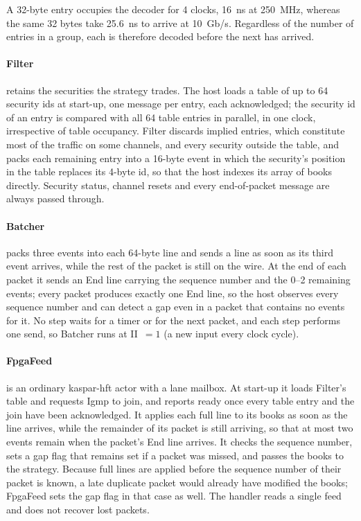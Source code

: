\documentclass[11pt]{article}
\begin{document}
A 32-byte entry occupies the decoder for 4 clocks, 16~ns at 250~MHz, whereas
the same 32 bytes take 25.6~ns to arrive at 10~Gb/s. Regardless of the number
of entries in a group, each is therefore decoded before the next has arrived.

\paragraph{Filter} retains the securities the strategy trades. The host loads a
table of up to 64 security ids at start-up, one message per entry, each
acknowledged; the security id of an entry is compared with all 64 table entries
in parallel, in one clock, irrespective of table occupancy. Filter discards
implied entries, which constitute most of the traffic on some channels, and
every security outside the table, and packs each remaining entry into a
16-byte event in which the security's position in the table replaces its
4-byte id, so that the host indexes its array of books directly. Security
status, channel resets and every end-of-packet message are always passed
through.

\paragraph{Batcher} packs three events into each 64-byte line and sends a line
as soon as its third event arrives, while the rest of the packet is still on
the wire. At the end of each packet it sends an End line carrying the sequence
number and the 0--2 remaining events; every packet produces exactly one End
line, so the host observes every sequence number and can detect a gap even in a
packet that contains no events for it. No step waits for a timer or for the
next packet, and each step performs one send, so Batcher runs at II~$=1$ (a new input every clock cycle).

\paragraph{FpgaFeed} is an ordinary kaspar-hft actor with a lane mailbox. At
start-up it loads Filter's table and requests Igmp to join, and reports ready
once every table entry and the join have been acknowledged. It applies each
full line to its books as soon as the line arrives, while the remainder of its
packet is still arriving, so that at most two events remain when the packet's
End line arrives. It checks the sequence number, sets a gap flag that remains
set if a packet was missed, and passes the books to the strategy. Because full
lines are applied before the sequence number of their packet is known, a late
duplicate packet would already have modified the books; FpgaFeed sets the gap
flag in that case as well. The handler reads a single feed and does not
recover lost packets.
\end{document}
